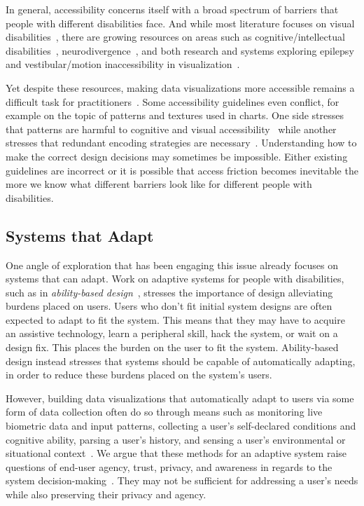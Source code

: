 \documentclass[12pt]{cmuthesis}
\begin{document}
In general, accessibility concerns itself with a broad spectrum of barriers that people with different disabilities face. And while most literature focuses on visual disabilities~\cite{Wimer, Marriott}, there are growing resources on areas such as cognitive/intellectual disabilities~\cite{Wu2021Understanding, Wood2024}, neurodivergence~\cite{Tran}, and both research and systems exploring epilepsy and vestibular/motion inaccessibility in visualization~\cite{South, Sivaraman}.


Yet despite these resources, making data visualizations more accessible remains a difficult task for practitioners~\cite{Sharif2024Challenges, Joyner2022Wild}. Some accessibility guidelines even conflict, for example on the topic of patterns and textures used in charts. One side stresses that patterns are harmful to cognitive and visual accessibility~\cite{Schepers} while another stresses that redundant encoding strategies are necessary~\cite{Elavsky2022Chartability}. Understanding how to make the correct design decisions may sometimes be impossible. Either existing guidelines are incorrect or it is possible that access friction becomes inevitable the more we know what different barriers look like for different people with disabilities.

\subsection{Systems that Adapt}

One angle of exploration that has been engaging this issue already focuses on systems that can adapt. Work on adaptive systems for people with disabilities, such as in \textit{ability-based design}~\cite{Wobbrock2011Ability}, stresses the importance of design alleviating burdens placed on users. Users who don't fit initial system designs are often expected to adapt to fit the system. This means that they may have to acquire an assistive technology, learn a peripheral skill, hack the system, or wait on a design fix. This places the burden on the user to fit the system. Ability-based design instead stresses that systems should be capable of automatically adapting, in order to reduce these burdens placed on the system's users. 

However, building data visualizations that automatically adapt to users via some form of data collection often do so through means such as monitoring live biometric data and input patterns, collecting a user's self-declared conditions and cognitive ability, parsing a user's history, and sensing a user's environmental or situational context~\cite{Yanez}. We argue that these methods for an adaptive system raise questions of end-user agency, trust, privacy, and awareness in regards to the system decision-making~\cite{Pallapa}. They may not be sufficient for addressing a user's needs while also preserving their privacy and agency.
\end{document}
